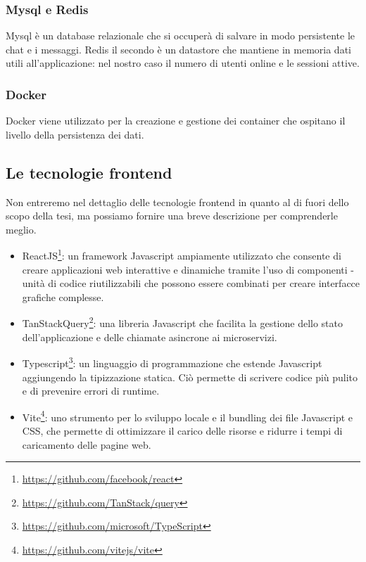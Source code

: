 \subsubsection{Mysql e Redis}
Mysql è un database relazionale che si occuperà di salvare in modo persistente le chat e i messaggi. Redis il secondo è
un datastore che mantiene in memoria dati utili all'applicazione: nel nostro caso il numero di utenti online e le
sessioni attive.

\subsubsection{Docker}
Docker viene utilizzato per la creazione e gestione dei container che ospitano il livello della persistenza dei dati.

\subsection{Le tecnologie frontend}
Non entreremo nel dettaglio delle tecnologie frontend in quanto al di fuori dello scopo della tesi, ma possiamo fornire
una breve descrizione per comprenderle meglio.

\begin{itemize}
    \item ReactJS\footnote{\url{https://github.com/facebook/react}}: un framework Javascript ampiamente utilizzato che consente di creare applicazioni web interattive e
    dinamiche tramite l'uso di componenti - unità di codice riutilizzabili che possono essere combinati per creare
    interfacce grafiche complesse.
    \item TanStackQuery\footnote{\url{https://github.com/TanStack/query}}: una libreria Javascript che facilita la gestione dello stato dell'applicazione e delle chiamate asincrone ai microservizi.
    \item Typescript\footnote{\url{https://github.com/microsoft/TypeScript}}: un linguaggio di programmazione che estende Javascript aggiungendo la tipizzazione statica. Ciò
    permette di scrivere codice più pulito e di prevenire errori di runtime.
    \item Vite\footnote{\url{https://github.com/vitejs/vite}}: uno strumento per lo sviluppo locale e il bundling dei file Javascript e CSS, che permette di
    ottimizzare il carico delle risorse e ridurre i tempi di caricamento delle pagine web.
\end{itemize}

